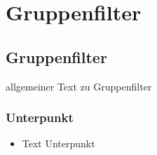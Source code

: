 \chapter{Gruppenfilter}\label{gruppenfilter}
\minitoc
\clearpage
\section{Gruppenfilter}
allgemeiner Text zu Gruppenfilter 

\subsection*{Unterpunkt}
\begin{itemize}
	\item Text Unterpunkt
\end{itemize}

\clearpage